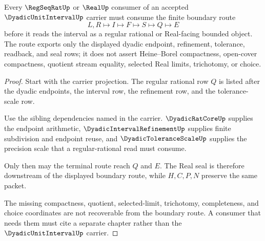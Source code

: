 \begin{theorem}
\label{thm:dyadic-unit-interval-regseqrat-boundary-consumption}
Every $\RegSeqRatUp$ or $\RealUp$ consumer of an accepted $\DyadicUnitIntervalUp$ carrier must consume the finite boundary route
$$
L,R\longmapsto I\longmapsto F\longmapsto S\longmapsto Q\longmapsto E
$$
before it reads the interval as a regular rational or Real-facing bounded object. The route exports only the displayed dyadic endpoint, refinement, tolerance, readback, and seal rows; it does not assert Heine--Borel compactness, open-cover compactness, quotient stream equality, selected Real limits, trichotomy, or choice.
\end{theorem}
\begin{proof}
Start with the carrier projection. The regular rational row $Q$ is listed after the dyadic endpoints, the interval row, the refinement row, and the tolerance-scale row.

Use the sibling dependencies named in the carrier. $\DyadicRatCoreUp$ supplies the endpoint arithmetic, $\DyadicIntervalRefinementUp$ supplies finite subdivision and endpoint reuse, and $\DyadicToleranceScaleUp$ supplies the precision scale that a regular-rational read must consume.

Only then may the terminal route reach $Q$ and $E$. The Real seal is therefore downstream of the displayed boundary route, while $H,C,P,N$ preserve the same packet.

The missing compactness, quotient, selected-limit, trichotomy, completeness, and choice coordinates are not recoverable from the boundary route. A consumer that needs them must cite a separate chapter rather than the $\DyadicUnitIntervalUp$ carrier.
\end{proof}


\begin{closurestatus}{\DyadicUnitIntervalUp}
  \theoryclosure{\seedClosure}
  \formalstatus{\unformalizedV}
\end{closurestatus}

